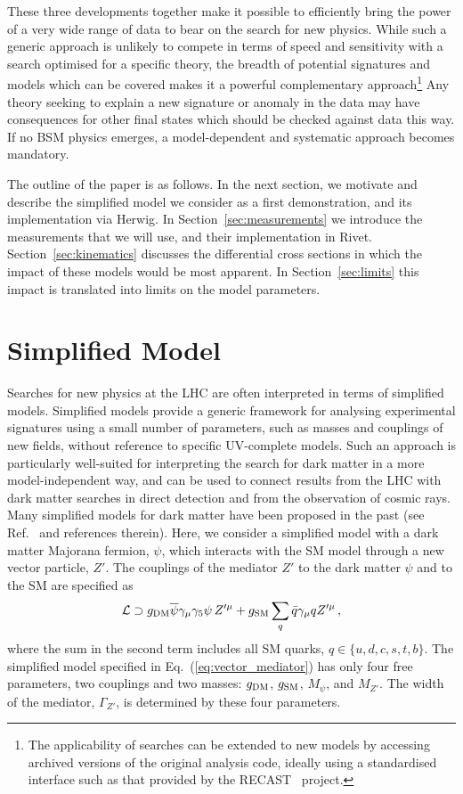 \documentclass[floatfix]{article}
\begin{document}
These three developments together make it possible to efficiently 
bring the power of a very wide range of data to bear on the search for new physics. While such a generic approach is
unlikely to compete in terms of speed and sensitivity with a search optimised for a specific theory, the breadth
of potential signatures and models which can be covered makes it a powerful complementary approach\footnote{The applicability of 
searches can be extended to new models by accessing archived versions of the original analysis code, ideally using a standardised 
interface such as that provided by the RECAST~\cite{Cranmer:2010hk} project.}
Any theory seeking
to explain a new signature or anomaly in the data may have consequences for other final states which should be checked 
against data this way. If no BSM physics emerges, a model-dependent and systematic approach becomes mandatory.

The outline of the paper is as follows. In the next section, we motivate and describe the 
simplified model we consider as a first demonstration, and its implementation via Herwig. 
In Section~\ref{sec:measurements} we introduce the measurements that we will use, and their implementation in Rivet. 
Section~\ref{sec:kinematics} discusses the differential cross sections in which the impact of these models would be 
most apparent. In Section~\ref{sec:limits} this impact is translated into limits on the model parameters.


\section{Simplified Model}\label{sec:models}
Searches for new physics at the LHC are often interpreted in terms of simplified models. Simplified models provide a generic 
framework for analysing experimental signatures using a small number of parameters, such as masses and 
couplings of new fields, without reference to specific UV-complete models. Such an  approach is particularly 
well-suited for interpreting the search for dark matter in a more model-independent way, and can be used to connect results from the LHC with dark matter 
searches in direct detection and from the observation of cosmic rays. Many simplified models for dark matter have been proposed 
in the past (see Ref.~\cite{Abercrombie:2015wmb} and references therein). Here, we consider a simplified model with a dark matter Majorana 
fermion, $\psi$, which interacts with the SM model through a new vector particle, $Z'$. The couplings of the mediator $Z'$ to the dark matter $\psi$ and to the 
SM are specified as %
\begin{align}\label{eq:vector_mediator}
 {\cal L} \supset  g_{\rm DM}\overline{\psi} \gamma_{\mu}\gamma_5 \psi\,Z'^{\mu} + g_{\rm SM}\sum_{q} \bar q \gamma_{\mu} q Z'^{\mu} \,,
\end{align}
%
where the sum in the second term includes all SM quarks, $q \in \{u,d,c,s,t,b\}$. The simplified model specified in Eq.~(\ref{eq:vector_mediator}) has only four free parameters, two couplings and two masses: $g_{\rm DM}$, $g_{\rm SM}$, $M_\psi$, and $M_{Z'}$. The width of the mediator, $\Gamma_{Z'}$, is determined by these four parameters. 
\end{document}

